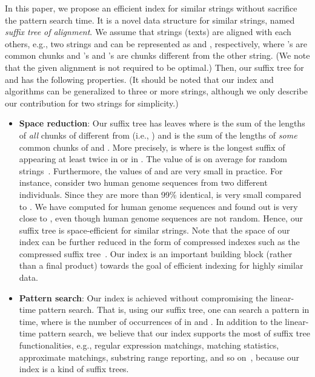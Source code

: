 \documentclass{llncs}
\newcommand{\partitle}[1]{}                        \newcommand{\commentout}[1]{}
\newcommand{\bi}{\begin{itemize}}
\newcommand{\ei}{\end{itemize}}
\begin{document}
\partitle{Our contribution}
In this paper, we propose an efficient index for similar strings
without sacrifice the pattern search time.
It is  a novel data structure for similar strings,
 named {\em suffix tree of alignment}.
We assume that strings (texts) are aligned with each others, e.g.,
 two strings  and  can be represented as
  and
 , respectively,
 where 's are common chunks and
  's and 's are chunks different from the other string.
(We note that the given alignment is not required to be optimal.)
Then, our suffix tree for  and 
 has the following properties.
(It should be noted that our index and algorithms can be generalized to three or more strings,
although we only describe our contribution for two strings
for simplicity.)
\bi
\item {\bf Space reduction}:
Our suffix tree has  leaves
 where  is the sum of the lengths of {\em all} chunks of  different from 
 (i.e., )
 and  is the sum of the lengths of {\em some} common chunks of  and .
More precisely,  is 
 where  is the longest suffix of  appearing at least twice in  or in .
The value of  is  on average for random
 strings~\cite{karlin1983new}.
Furthermore, the values of  and  are very small in practice.
For instance, consider
two human genome sequences from two different individuals.
Since they are more than 99\% identical,
 is very small compared to .
We have computed  for human genome sequences
and found out  is very close to ,
even though human genome sequences are not random.
Hence, our suffix tree is space-efficient for similar strings.
Note that the space of our index can be further reduced
 in the form of compressed indexes
 such as the compressed suffix tree~\cite{Grossi&Vitter:05,Sadakane07TCS}.
Our index is an important building block (rather than a final product)
 towards the goal of efficient indexing for highly similar data.
\item {\bf Pattern search}:
Our index is achieved without compromising the linear-time pattern search.
That is, using our suffix tree, one can search a pattern  in  time,
 where  is the number of occurrences of  in  and .
In addition to the linear-time pattern search,
 we believe that our index supports the most of suffix tree functionalities,
 e.g., regular expression matchings, matching statistics, approximate matchings,
 substring range reporting,
 and so on~\cite{Baeza-Yates&Gonnet:96,Bille&Gortz:11,Gusfield:97},
 because our index is a kind of suffix trees.
\ei


\partitle{contribution 2}
\end{document}
